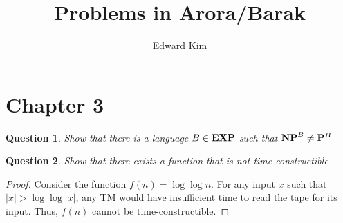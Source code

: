 \documentclass[12pt]{article}
\title{Problems in Arora/Barak}
\author{Edward Kim}
\newtheorem{question}{Question}[section]
\begin{document}
\maketitle
\hrulefill


\section{Chapter 3}


\begin{question}
	Show that there is a language $B \in \bold{EXP}$ such that $\bold{NP}^B \neq \bold{P}^B$
\end{question}

\begin{question}
	Show that there exists a function that is not time-constructible
\end{question}

\begin{proof}
	Consider the function $f(n) = \log \log n $. For any input $x$ such that $|x| > \log \log |x|$, any TM would have insufficient time to read the tape for its input. Thus, $f(n)$ cannot be time-constructible.
\end{proof}
\end{document}
